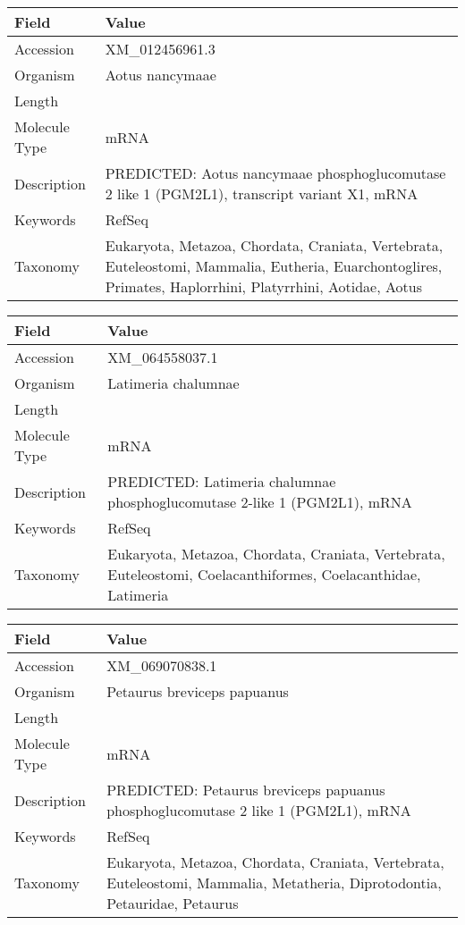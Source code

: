 \documentclass[10pt]{article}
\begin{document}
\vspace{1em}
{\footnotesize
\begin{longtable}{>{\raggedright\arraybackslash}p{4.5cm} >{\raggedright\arraybackslash}p{11.5cm}}
\textbf{Field} & \textbf{Value} \\
\hline
Accession & XM\_012456961.3 \\
Organism & Aotus nancymaae \\
Length & 4704 \\
Molecule Type & mRNA \\
Description & PREDICTED: Aotus nancymaae phosphoglucomutase 2 like 1 (PGM2L1), transcript variant X1, mRNA \\
Keywords & RefSeq \\
Taxonomy & Eukaryota, Metazoa, Chordata, Craniata, Vertebrata, Euteleostomi, Mammalia, Eutheria, Euarchontoglires, Primates, Haplorrhini, Platyrrhini, Aotidae, Aotus \\
\end{longtable}
}

\vspace{1em}
{\footnotesize
\begin{longtable}{>{\raggedright\arraybackslash}p{4.5cm} >{\raggedright\arraybackslash}p{11.5cm}}
\textbf{Field} & \textbf{Value} \\
\hline
Accession & XM\_064558037.1 \\
Organism & Latimeria chalumnae \\
Length & 2649 \\
Molecule Type & mRNA \\
Description & PREDICTED: Latimeria chalumnae phosphoglucomutase 2-like 1 (PGM2L1), mRNA \\
Keywords & RefSeq \\
Taxonomy & Eukaryota, Metazoa, Chordata, Craniata, Vertebrata, Euteleostomi, Coelacanthiformes, Coelacanthidae, Latimeria \\
\end{longtable}
}

\vspace{1em}
{\footnotesize
\begin{longtable}{>{\raggedright\arraybackslash}p{4.5cm} >{\raggedright\arraybackslash}p{11.5cm}}
\textbf{Field} & \textbf{Value} \\
\hline
Accession & XM\_069070838.1 \\
Organism & Petaurus breviceps papuanus \\
Length & 10471 \\
Molecule Type & mRNA \\
Description & PREDICTED: Petaurus breviceps papuanus phosphoglucomutase 2 like 1 (PGM2L1), mRNA \\
Keywords & RefSeq \\
Taxonomy & Eukaryota, Metazoa, Chordata, Craniata, Vertebrata, Euteleostomi, Mammalia, Metatheria, Diprotodontia, Petauridae, Petaurus \\
\end{longtable}
}
\end{document}
